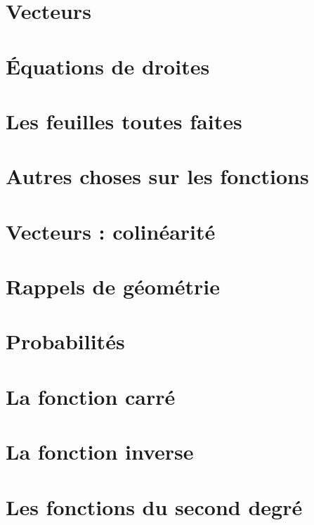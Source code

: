 \documentclass[a4paper,12pt]{book}
\begin{document}
\chapter{Vecteurs}


\chapter{Équations de droites}


\chapter{Les feuilles toutes faites}



\chapter{Autres choses sur les fonctions}



\chapter{Vecteurs : colinéarité}


\chapter{Rappels de géométrie}


\chapter{Probabilités}


\chapter{La fonction carré}


\chapter{La fonction inverse}


\chapter{Les fonctions du second degré}

\end{document}
